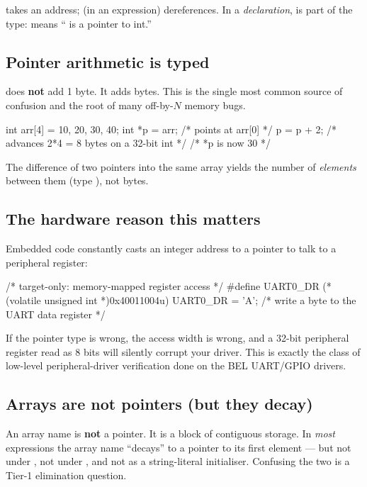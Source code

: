 \code{\&} takes an address; \code{*} (in an expression) dereferences. In a
\emph{declaration}, \code{*} is part of the type:  means
`` is a pointer to int.''

\subsection{Pointer arithmetic is typed}

 does \textbf{not} add 1 byte. It adds
 bytes. This is the single most common source of
confusion and the root of many off-by-$N$ memory bugs.

\begin{cgym}
int arr[4] = {10, 20, 30, 40};
int *p = arr;     /* points at arr[0]                       */
p = p + 2;        /* advances 2*4 = 8 bytes on a 32-bit int */
/* *p is now 30 */
\end{cgym}

The difference of two pointers into the same array yields the number of
\emph{elements} between them (type ), not bytes.

\subsection{The hardware reason this matters}

Embedded code constantly casts an integer address to a pointer to talk to a
peripheral register:

\begin{cgym}
/* target-only: memory-mapped register access */
#define UART0_DR (*(volatile unsigned int *)0x40011004u)
UART0_DR = 'A';   /* write a byte to the UART data register */
\end{cgym}

If the pointer type is wrong, the access width is wrong, and a 32-bit
peripheral register read as 8 bits will silently corrupt your driver. This is
exactly the class of low-level peripheral-driver verification done on the BEL
UART/GPIO drivers.

\subsection{Arrays are not pointers (but they decay)}

An array name is \textbf{not} a pointer. It is a block of contiguous storage.
In \emph{most} expressions the array name ``decays'' to a pointer to its first
element --- but not under , not under \code{\&}, and not as a
string-literal initialiser. Confusing the two is a Tier-1 elimination
question.

